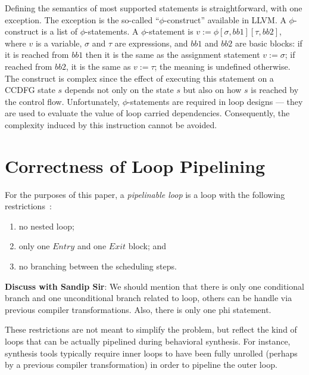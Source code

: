Defining the semantics of most supported statements is
straightforward, with one exception.  The exception is the
so-called ``$\phi$-construct'' available in LLVM.  A
$\phi$-construct is a list of $\phi$-statements.  A
$\phi$-statement is $v := \phi [\sigma, bb1] [\tau, bb2]$,
where $v$ is a variable, $\sigma$ and $\tau$ are
expressions, and $bb1$ and $bb2$ are basic blocks: if it is
reached from $bb1$ then it is the same as the assignment
statement $v := \sigma$; if reached from $bb2$, it is the
same as $v := \tau$; the meaning is undefined otherwise. The
construct is complex since the effect of executing this
statement on a CCDFG state $s$ depends not only on the state
$s$ but also on how $s$ is reached by the control flow.
Unfortunately, $\phi$-statements are required in loop designs ---
they are used to evaluate the value of loop carried dependencies.
Consequently, the complexity induced
by this instruction cannot be avoided.

\section{Correctness of Loop Pipelining}

For the purposes of this paper, a {\em pipelinable loop} is
a loop with the following restrictions~\cite{hrx:dac-12}:
\begin{enumerate}
\item no nested loop;
\item only one $Entry$ and one $Exit$ block; and
\item no branching between the scheduling steps.
\end{enumerate}

{\bf Discuss with Sandip Sir}: We should mention that there is only one conditional branch and one unconditional branch related to loop,
others can be handle via previous compiler transformations. Also, there is only one phi statement. 

These restrictions are not meant to simplify the problem, but reflect
the kind of loops that can be actually pipelined during behavioral
synthesis.  For instance, synthesis tools typically require inner
loops to have been fully unrolled (perhaps by a previous compiler
transformation) in order to pipeline the outer loop.

